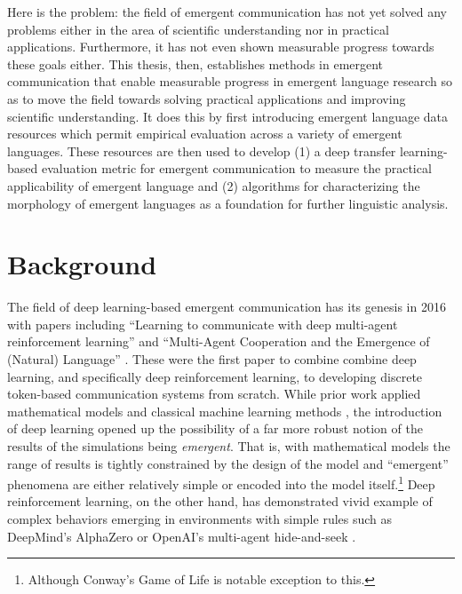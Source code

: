 Here is the problem: the field of emergent communication has not yet solved any problems either in the area of scientific understanding nor in practical applications.
Furthermore, it has not even shown measurable progress towards these goals either.
This thesis, then, establishes methods in emergent communication that enable measurable progress in emergent language research so as to move the field towards solving practical applications and improving scientific understanding.
It does this by first introducing emergent language data resources which permit empirical evaluation across a variety of emergent languages.
These resources are then used to develop
  (1) a deep transfer learning-based evaluation metric for emergent communication to measure the practical applicability of emergent language
  and (2) algorithms for characterizing the morphology of emergent languages as a foundation for further linguistic analysis.

\section{Background}

The field of deep learning-based emergent communication has its genesis in 2016 with papers including
  ``Learning to communicate with deep multi-agent reinforcement learning'' \citep{foerster2016learning}
  and ``Multi-Agent Cooperation and the Emergence of (Natural) Language'' \citep{lazaridou2016multiagent}.
These were the first paper to combine combine deep learning, and specifically deep reinforcement learning, to developing discrete token-based communication systems from scratch.
While prior work applied mathematical models \citep{brighton2005} and classical machine learning methods \citep{werner_Dyer_1991}, the introduction of deep learning opened up the possibility of a far more robust notion of the results of the simulations being \emph{emergent}.
That is, with mathematical models the range of results is tightly constrained by the design of the model and ``emergent'' phenomena are either relatively simple or encoded into the model itself.\footnote{Although Conway's Game of Life is notable exception to this.}
Deep reinforcement learning, on the other hand, has demonstrated vivid example of complex behaviors emerging in environments with simple rules such as DeepMind's AlphaZero \citep{silver2017masteringchessshogiselfplay} or OpenAI's multi-agent hide-and-seek \citep{baker2020emergenttoolusemultiagent}.

